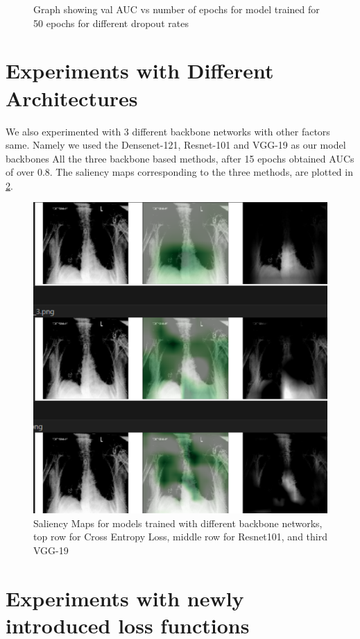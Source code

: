 \begin{figure}
\begin{minipage}[b]{0.45\textwidth}
    \caption{Graph showing val AUC vs number of epochs for model trained for 50 epochs for different dropout rates}
    \label{fig:drop}
  \end{minipage}
\end{figure}
\section{Experiments with Different Architectures}
We also experimented with 3 different backbone networks with other factors same. Namely we used the Densenet-121, Resnet-101 and VGG-19 as our model backbones
All the three backbone based methods, after 15 epochs obtained AUCs of over 0.8. The saliency maps corresponding to the three methods, are plotted in \ref{sal_diff_loss}.
\begin{figure}[!htbp]
  \begin{center}
    \leavevmode
    \ifpdf
      \includegraphics[scale=0.6]
      {Chapter3/Chapter3Figs/sal_arch}    
    \fi
    \caption{Saliency Maps for models trained with different backbone networks, top row for Cross Entropy Loss, middle row for Resnet101, and third VGG-19}
    \label{sal_diff_loss}
  \end{center}
\end{figure}
\section{Experiments with newly introduced loss functions}

